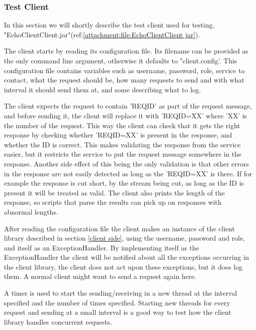 \subsubsection{Test Client}\label{Testing:About:Client}
    In this section we will shortly describe the test client used for testing, "EchoClientClient.jar"(ref:\ref{attachment:file:EchoClientClient jar}).

    The client starts by reading its configuration file. Its filename can be provided as the only command line argument, otherwise it defaults to "client.config'. This configuration file contains variables such as username, password, role, service to contact, what the request should be, how many requests to send and with what interval it should send them at, and some describing what to log.

    The client expects the request to contain '{REQID}' as part of the request message, and before sending it, the client will replace it with '{REQID=XX}' where 'XX' is the number of the request. This way the client can check that it gets the right response by checking whether '{REQID=XX}' is present in the response, and whether the ID is correct. This makes validating the response from the service easier, but it restricts the service to put the request message somewhere in the response. Another side effect of this being the only validation is that other errors in the response are not easily detected as long as the '{REQID=XX}' is there. If for example the response is cut short, by the stream being cut, as long as the ID is present it will be treated as valid. The client also prints the length of the response, so scripts that parse the results can pick up on responses with abnormal lengths.

    After reading the configuration file the client makes an instance of the client library described in section \ref{client side}, using the username, password and role, and itself as an ExceptionHandler. By implementing itself as the ExceptionHandler the client will be notified about all the exceptions occurring in the client library, the client does not act upon these exceptions, but it does log them. A normal client might want to send a request again here.
    
    A timer is used to start the sending/receiving in a new thread at the interval specified and the number of times specified. Starting new threads for every request and sending at a small interval is a good way to test how the client library handles concurrent requests.

